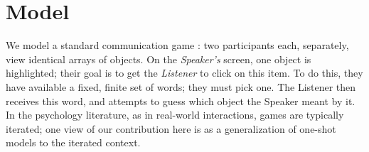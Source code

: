 \documentclass{article} %
\begin{document}
\section{Model}

We model a standard communication game \cite{krauss1964,clark1986}:
two participants each, separately, view identical arrays of
objects. On the \textit{Speaker's} screen, one object is highlighted;
their goal is to get the \textit{Listener} to click on this item. To
do this, they have available a fixed, finite set of words; they must
pick one. The Listener then receives this word, and attempts to guess
which object the Speaker meant by it. In the psychology literature, as
in real-world interactions, games are typically iterated; one view of
our contribution here is as a generalization of one-shot models
\cite{frank2012,bergen2012} to the iterated context.
\end{document}
